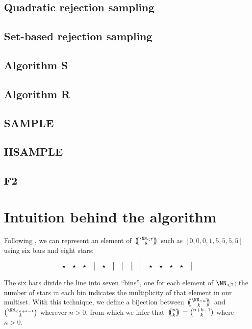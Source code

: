 \documentclass[letterpaper,luatex,11pt]{article}
\newcommand{\multichoose}[2]{
\left.\mathchoice
  {\left(\kern-0.48em\binom{#1}{#2}\kern-0.48em\right)}
  {\big(\kern-0.30em\binom{\smash{#1}}{\smash{#2}}\kern-0.30em\big)}
  {\left(\kern-0.30em\binom{\smash{#1}}{\smash{#2}}\kern-0.30em\right)}
  {\left(\kern-0.30em\binom{\smash{#1}}{\smash{#2}}\kern-0.30em\right)}
\right.}
\begin{document}
\subsection{Quadratic rejection sampling}
\subsection{Set-based rejection sampling}
\subsection{Algorithm S}
\subsection{Algorithm R}
\subsection{SAMPLE}
\subsection{HSAMPLE}
\subsection{F2}


\section{Intuition behind the algorithm}

Following \cite{feller}, we can represent an element of \(\multichoose{\NN_{<7}}{8}\)
such as \([0,0,0,1,5,5,5,5]\) using six bars and eight stars:

\begin{displaymath}
    \begin{array}{ c c c c c c c c c c c c c c c }
        \star & \star & \star & \big| & \star & \big| & \big| & \big| & \big| & \star & \star & \star & \star & \big| \\
    \end{array}
\end{displaymath}

The six bars divide the line into seven ``bins'', one for each element of \(\NN_{<7}\); the
number of stars in each bin indicates the multiplicity of that element in our multiset.
With this technique, we define a bijection between \(\multichoose{\NN_{<n}}{k}\) and
\(\binom{\NN_{<n + k - 1}}{k}\) wherever \(n > 0\), from which we infer that
\(\multichoose{n}{k} = \binom{n + k - 1}{k}\) where \(n > 0\).
\end{document}
